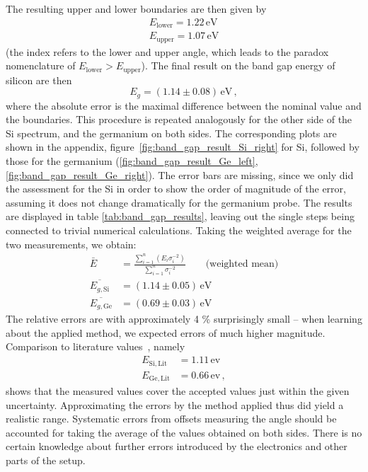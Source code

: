 The resulting upper and lower boundaries are then given by
\begin{align}
    E_\mathrm{lower} = 1.22 \, \mathrm{eV} \\
    E_\mathrm{upper} = 1.07 \, \mathrm{eV}
\end{align}
(the index refers to the lower and upper angle, which leads to the 
    paradox nomenclature of $E_\mathrm{lower} > E_\mathrm{upper}$). 
The final result on the band gap energy of silicon are then
\begin{equation}
    E_g = (1.14 \pm 0.08) \, \mathrm{eV} \, ,
\end{equation}
where the absolute error is the maximal difference between the nominal value 
and the boundaries. 
This procedure is repeated analogously for the other side of the Si spectrum, 
and the germanium on both sides. 
The corresponding plots are shown in the appendix, 
figure~\ref{fig:band_gap_result_Si_right} for Si, followed by those for the 
germanium (\ref{fig:band_gap_result_Ge_left}, \ref{fig:band_gap_result_Ge_right}). 
The error bars are missing, since we only did the assessment for the Si in order to 
show the order of magnitude of the error, assuming it does not change dramatically for the 
germanium probe. 
The results are displayed in table \ref{tab:band_gap_results}, leaving out 
the single steps being connected to trivial numerical calculations. 
Taking the weighted average for the two measurements, we obtain:
\begin{align}
    \bar{E} &= \frac{ \sum_{i=1}^n \left( E_i \sigma_i^{-2} \right)}{\sum_{i=1}^n \sigma_i^{-2}} \qquad \text{(weighted mean)} \\
    \overline{E_{g, \mathrm{Si}}} &= (1.14 \pm 0.05) \,\mathrm{eV} \\
    \overline{E_{g, \mathrm{Ge}}} &= (0.69 \pm 0.03) \,\mathrm{eV}
\end{align}
The relative errors are with approximately 4 \% surprisingly small -- when learning about 
the applied method, we expected errors of much higher magnitude. 
Comparison to literature values~\cite{kittel1976introduction}, namely
\begin{align}
    E_\mathrm{Si, Lit} &= 1.11 \, \mathrm{ev} \\
    E_\mathrm{Ge, Lit} &= 0.66 \, \mathrm{ev} \, ,
\end{align}
shows that the measured values cover the accepted values just within the given uncertainty. 
Approximating the errors by the method applied thus did yield a realistic range. 
Systematic errors from offsets measuring the angle should be accounted for taking the 
average of the values obtained on both sides. There is no certain knowledge about 
further errors introduced by the electronics and other parts of the setup. 

